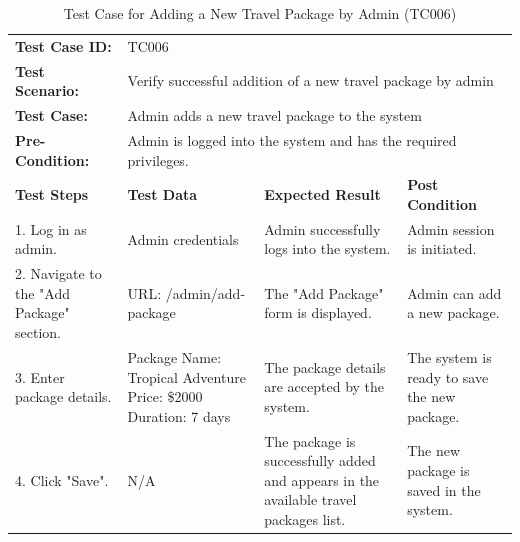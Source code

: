 \documentclass{scrreprt}
\begin{document}
\begin{longtable}{| m{2cm} | m{5cm} | m{4cm} | m{3cm} |}
    \caption{Test Case for Adding a New Travel Package by Admin (TC006)}
    \vspace{0.5cm} \\ \hline
    \textbf{Test Case ID:} & \multicolumn{3}{l|}{TC006} \\ \hline
    \textbf{Test Scenario:} & \multicolumn{3}{l|}{Verify successful addition of a new travel package by admin} \\ \hline
    \textbf{Test Case:} & \multicolumn{3}{l|}{Admin adds a new travel package to the system} \\ \hline
    \textbf{Pre-Condition:} & \multicolumn{3}{l|}{Admin is logged into the system and has the required privileges.} \\ \hline
    \textbf{Test Steps} & \textbf{Test Data} & \textbf{Expected Result} & \textbf{Post Condition} \\ \hline
    1. Log in as admin. & Admin credentials & Admin successfully logs into the system. & Admin session is initiated. \\ \hline
    2. Navigate to the "Add Package" section. & URL: /admin/add-package & The "Add Package" form is displayed. & Admin can add a new package. \\ \hline
    3. Enter package details. & Package Name: Tropical Adventure \newline Price: \$2000 \newline Duration: 7 days & The package details are accepted by the system. & The system is ready to save the new package. \\ \hline
    4. Click "Save". & N/A & The package is successfully added and appears in the available travel packages list. & The new package is saved in the system. \\ \hline
    \end{longtable}
    
    \vspace{1cm}
    
\end{document}
